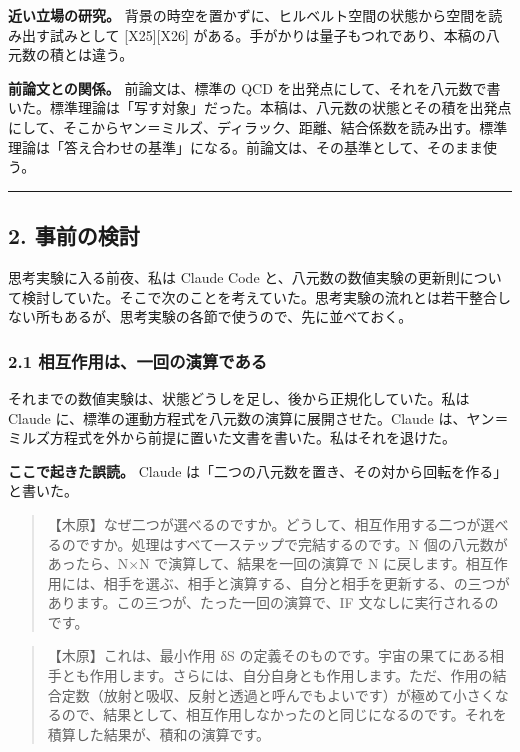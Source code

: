 \documentclass[
  a4paper,
]{ltjsarticle}
\begin{document}
\textbf{近い立場の研究。}
背景の時空を置かずに、ヒルベルト空間の状態から空間を読み出す試みとして
{[}X25{]}{[}X26{]}
がある。手がかりは量子もつれであり、本稿の八元数の積とは違う。

\textbf{前論文との関係。} 前論文は、標準の QCD
を出発点にして、それを八元数で書いた。標準理論は「写す対象」だった。本稿は、八元数の状態とその積を出発点にして、そこからヤン＝ミルズ、ディラック、距離、結合係数を読み出す。標準理論は「答え合わせの基準」になる。前論文は、その基準として、そのまま使う。

\begin{center}\rule{0.5\linewidth}{0.5pt}\end{center}

\subsection{2. 事前の検討}\label{ux4e8bux524dux306eux691cux8a0e}

思考実験に入る前夜、私は Claude Code
と、八元数の数値実験の更新則について検討していた。そこで次のことを考えていた。思考実験の流れとは若干整合しない所もあるが、思考実験の各節で使うので、先に並べておく。

\subsubsection{2.1
相互作用は、一回の演算である}\label{ux76f8ux4e92ux4f5cux7528ux306fux4e00ux56deux306eux6f14ux7b97ux3067ux3042ux308b}

それまでの数値実験は、状態どうしを足し、後から正規化していた。私は
Claude に、標準の運動方程式を八元数の演算に展開させた。Claude
は、ヤン＝ミルズ方程式を外から前提に置いた文書を書いた。私はそれを退けた。

\textbf{ここで起きた誤読。} Claude
は「二つの八元数を置き、その対から回転を作る」と書いた。

\begin{quote}
【木原】なぜ二つが選べるのですか。どうして、相互作用する二つが選べるのですか。処理はすべて一ステップで完結するのです。N
個の八元数があったら、N×N で演算して、結果を一回の演算で N
に戻します。相互作用には、相手を選ぶ、相手と演算する、自分と相手を更新する、の三つがあります。この三つが、たった一回の演算で、IF
文なしに実行されるのです。
\end{quote}

\begin{quote}
【木原】これは、最小作用 δS
の定義そのものです。宇宙の果てにある相手とも作用します。さらには、自分自身とも作用します。ただ、作用の結合定数（放射と吸収、反射と透過と呼んでもよいです）が極めて小さくなるので、結果として、相互作用しなかったのと同じになるのです。それを積算した結果が、積和の演算です。
\end{quote}
\end{document}
